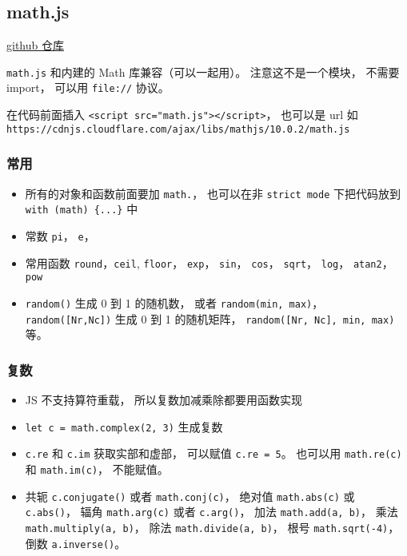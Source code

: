 \subsection{math.js}
\href{https://github.com/josdejong/mathjs}{github 仓库}

\verb|math.js| 和内建的 Math 库兼容（可以一起用）。 注意这不是一个模块， 不需要 import， 可以用 \verb|file://| 协议。

在代码前面插入 \verb|<script src="math.js"></script>|， 也可以是 url 如 \verb|https://cdnjs.cloudflare.com/ajax/libs/mathjs/10.0.2/math.js|

\subsubsection{常用}
\begin{itemize}
\item 所有的对象和函数前面要加 \verb|math.|， 也可以在非 \verb|strict mode| 下把代码放到 \verb|with (math) {...}| 中
\item 常数 \verb|pi|， \verb|e|， 
\item 常用函数 \verb|round|，\verb|ceil|, \verb|floor|， \verb|exp|， \verb|sin|， \verb|cos|， \verb|sqrt|， \verb|log|， \verb|atan2|， \verb|pow|
\item \verb|random()| 生成 0 到 1 的随机数， 或者 \verb|random(min, max)|， \verb|random([Nr,Nc])| 生成 0 到 1 的随机矩阵， \verb|random([Nr, Nc], min, max)| 等。
\end{itemize}

\subsubsection{复数}
\begin{itemize}
\item JS 不支持算符重载， 所以复数加减乘除都要用函数实现
\item \verb|let c = math.complex(2, 3)| 生成复数
\item \verb|c.re| 和 \verb|c.im| 获取实部和虚部， 可以赋值 \verb|c.re = 5|。 也可以用 \verb|math.re(c)| 和 \verb|math.im(c)|， 不能赋值。
\item 共轭 \verb|c.conjugate()| 或者 \verb|math.conj(c)|， 绝对值 \verb|math.abs(c)| 或 \verb|c.abs()|， 辐角 \verb|math.arg(c)| 或者 \verb|c.arg()|， 加法 \verb|math.add(a, b)|， 乘法 \verb|math.multiply(a, b)|， 除法 \verb|math.divide(a, b)|， 根号 \verb|math.sqrt(-4)|， 倒数 \verb|a.inverse()|。
\end{itemize}

